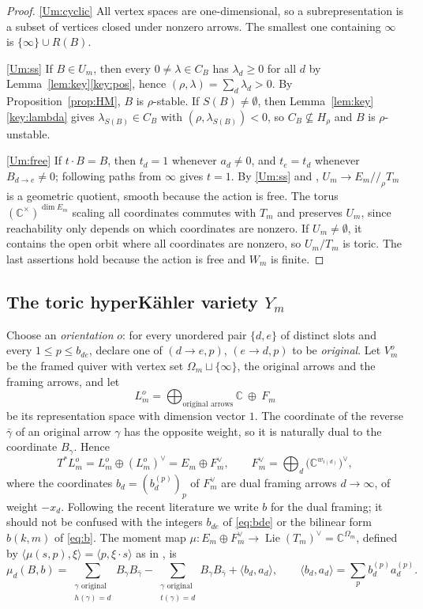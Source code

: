 \documentclass[11pt]{amsart}
\theoremstyle{definition}
\theoremstyle{remark}
\numberwithin{equation}{section}
\newcommand{\C}{\mathbb{C}}
\newcommand{\Om}{\Omega_m}
\begin{document}
\begin{proof}
\ref{Um:cyclic} All vertex spaces are one-dimensional, so a subrepresentation is a subset of vertices
closed under nonzero arrows. The smallest one containing $\infty$ is $\{\infty\}\cup R(B)$.

\ref{Um:ss} If $B\in U_m$, then every $0\neq\lambda\in C_B$ has $\lambda_d\ge0$ for all $d$ by
Lemma~\ref{lem:key}\ref{key:pos}, hence $(\rho,\lambda)=\sum_d\lambda_d>0$. By
Proposition~\ref{prop:HM}, $B$ is $\rho$-stable. If $S(B)\neq\emptyset$, then
Lemma~\ref{lem:key}\ref{key:lambda} gives $\lambda_{S(B)}\in C_B$ with $(\rho,\lambda_{S(B)})<0$, so
$C_B\not\subseteq H_\rho$ and $B$ is $\rho$-unstable.

\ref{Um:free} If $t\cdot B=B$, then $t_d=1$ whenever $a_d\neq0$, and $t_e=t_d$ whenever
$B_{d\to e}\neq0$; following paths from $\infty$ gives $t=1$. By \ref{Um:ss} and \cite[Theorem~2.2]{Hos},
$U_m\to E_m/\!/_\rho T_m$ is a geometric quotient, smooth because the action is free. The torus
$(\C^\times)^{\dim E_m}$ scaling all coordinates commutes with $T_m$ and preserves $U_m$, since
reachability only depends on which coordinates are nonzero. If $U_m\neq\emptyset$, it contains the open
orbit where all coordinates are nonzero, so $U_m/T_m$ is toric. The last assertions hold because the
action is free and $W_m$ is finite.
\end{proof}

\subsection{The toric hyperK\"ahler variety \texorpdfstring{$Y_m$}{Y\_m}}\label{subsec:Ym}
Choose an \emph{orientation} $o$: for every unordered pair $\{d,e\}$ of distinct slots and every
$1\le p\le b_{de}$, declare one of $(d\to e,p)$, $(e\to d,p)$ to be \emph{original}. Let $V^o_m$ be the
framed quiver with vertex set $\Om\sqcup\{\infty\}$, the original arrows and the framing arrows, and let
\[
  L^o_m=\bigoplus_{\text{original arrows}}\C\ \oplus\ F_m
\]
be its representation space with dimension vector $1$. The coordinate of the reverse $\bar\gamma$ of an
original arrow $\gamma$ has the opposite weight, so it is naturally dual to the coordinate $B_\gamma$.
Hence
\[
  T^*L^o_m=L^o_m\oplus(L^o_m)^\vee=E_m\oplus F_m^\vee,\qquad
  F_m^\vee=\bigoplus_d\big(\C^{w_{i(d)}}\big)^\vee,
\]
where the coordinates $b_d=(b^{(p)}_d)_p$ of $F_m^\vee$ are dual framing arrows $d\to\infty$, of weight
$-x_d$. Following the recent literature we write $b$ for the dual framing; it should not be confused with
the integers $b_{de}$ of \eqref{eq:bde} or the bilinear form $b(k,m)$ of \eqref{eq:b}. The
moment map $\mu:E_m\oplus F_m^\vee\to\operatorname{Lie}(T_m)^\vee=\C^{\Om}$, defined by
$\langle\mu(s,p),\xi\rangle=\langle p,\xi\cdot s\rangle$ as in \cite{Hik}, is
\[
  \mu_d(B,b)=\sum_{\substack{\gamma\text{ original}\\ h(\gamma)=d}}B_\gamma B_{\bar\gamma}
       -\sum_{\substack{\gamma\text{ original}\\ t(\gamma)=d}}B_\gamma B_{\bar\gamma}
       +\langle b_d,a_d\rangle ,\qquad \langle b_d,a_d\rangle=\sum_pb^{(p)}_da^{(p)}_d .
\]
\end{document}
